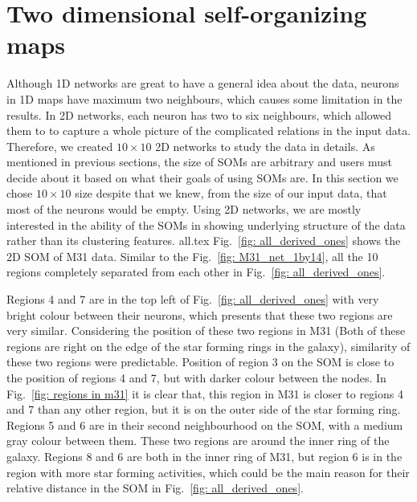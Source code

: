  \section{Two dimensional self-organizing maps}
 \label{sec: 2d_cluster}
    Although 1D networks are great to have a general idea about the data, neurons in 1D maps have maximum two neighbours, which causes some limitation in the results.
    In 2D networks, each neuron has two to six neighbours, which allowed them to to capture a whole picture of the complicated relations in the input data.
    Therefore, we created $10\times10$ 2D networks to study the data in details.
    As mentioned in previous sections, the size of SOMs are arbitrary and users must decide about it based on what their goals of using SOMs are.
    In this section we chose $10\times10$ size despite that we knew, from the size of our input data, that most of the neurons would be empty.
    Using 2D networks, we are mostly interested in the ability of the SOMs in showing underlying structure of the data rather than its clustering features.
    {all.tex}
    Fig.~\ref{fig: all_derived_ones} shows the 2D SOM of M31 data.
    Similar to the Fig.~\ref{fig: M31_net_1by14}, all the 10 regions completely separated from each other in Fig.~\ref{fig: all_derived_ones}.
    
    Regions 4 and 7 are in the top left of Fig.~\ref{fig: all_derived_ones} with very bright colour between their neurons, which presents that these two regions are very similar.
    Considering the position of these two regions in M31 (Both of these regions are right on the edge of the star forming rings in the galaxy), similarity of these two regions were predictable.
    Position of region 3 on the SOM is close to the position of regions 4 and 7, but with darker colour between the nodes. 
    In Fig.~\ref{fig: regions in m31} it is clear that, this region in M31 is closer to regions 4 and 7 than any other region, but it is on the outer side of the star forming ring.
    Regions 5 and 6 are in their second neighbourhood on the SOM, with a medium gray colour between them.
    These two regions are around the inner ring of the galaxy.
    Regions 8 and 6 are both in the inner ring of M31, but region 6 is in the region with more star forming activities, which could be the main reason for their relative distance in the SOM in Fig.~\ref{fig: all_derived_ones}. 
    
